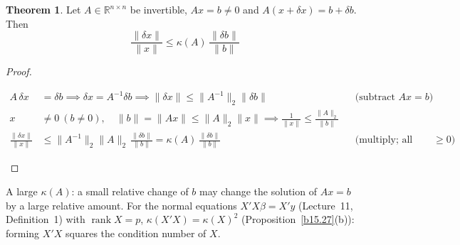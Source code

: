 \documentclass[12pt]{article}
\newcommand{\R}{\mathbb R}
\DeclareMathOperator{\rank}{rank}
\theoremstyle{definition}
\newtheorem{theorem}{Theorem}
\newcommand{\lec}[1]{Lecture~#1}
\newcommand{\boardtop}{\vspace*{-\abovedisplayskip}}
\begin{document}
\begin{theorem}\label{b15.28}
Let \(A\in\R^{n\times n}\) be invertible, \(Ax=b\ne0\) and \(A(x+\delta x)=b+\delta b\). Then
\[
\frac{\lVert\delta x\rVert}{\lVert x\rVert}\leqslant\kappa(A)\,\frac{\lVert\delta b\rVert}{\lVert b\rVert}
\]
\end{theorem}
\begin{proof}
\begin{board}
\boardtop
\begin{align*}
A\,\delta x&=\delta b\implies\delta x=A^{-1}\delta b\implies\lVert\delta x\rVert\leqslant\lVert A^{-1}\rVert_2\lVert\delta b\rVert
&&\text{(subtract \(Ax=b\))}\\
x&\ne0\ (b\ne0),\quad\lVert b\rVert=\lVert Ax\rVert\leqslant\lVert A\rVert_2\lVert x\rVert\implies
\frac1{\lVert x\rVert}\leqslant\frac{\lVert A\rVert_2}{\lVert b\rVert}\\
\frac{\lVert\delta x\rVert}{\lVert x\rVert}&\leqslant\lVert A^{-1}\rVert_2\lVert A\rVert_2\,\frac{\lVert\delta b\rVert}{\lVert b\rVert}
=\kappa(A)\,\frac{\lVert\delta b\rVert}{\lVert b\rVert}&&\text{(multiply; all terms \(\geqslant0\))}
\end{align*}
\end{board}
\nopagebreak
\end{proof}
A large \(\kappa(A)\): a small relative change of \(b\) may change the solution of \(Ax=b\) by a large relative amount.
For the normal equations \(X'X\beta=X'y\) (\lec{11}, Definition~1) with \(\rank X=p\), \(\kappa(X'X)=\kappa(X)^2\)
(Proposition~\ref{b15.27}(b)): forming \(X'X\) squares the condition number of \(X\).
\end{document}
